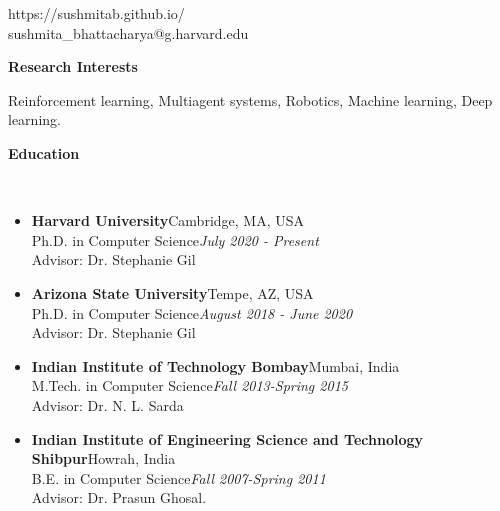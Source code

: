 \documentclass[a4paper,11pt]{article}
\newcommand{\lsep}{-0.5cm}
\newcommand{\resheading}[1]{{\small \colorbox{mygrey}{\begin{minipage}{0.975\textwidth}{\textbf{#1 \vphantom{p\^{E}}}}\end{minipage}}}}
\begin{document}
	
	\hfill https://sushmitab.github.io/\\
	\hfill sushmita\_bhattacharya@g.harvard.edu\\
	\setlength{\tabcolsep}{5pt}
	
	\vspace{10pt}
	
	\resheading{\textbf{\large Research Interests}}
	\begin{description}
		\item \hspace{0.75 cm} Reinforcement learning, Multiagent systems, Robotics, Machine learning, Deep learning.
	\end{description}
	
	\resheading{\textbf{\large Education} }\\[\lsep]
	\begin{description}
		\item 
		\begin{itemize}
			\item \textbf{Harvard  University}\hfill Cambridge, MA, USA\\
			Ph.D. in Computer Science\hfill \textit{July 2020 - Present}\\
			Advisor: Dr. Stephanie Gil
		\end{itemize}
		\item
		\begin{itemize}
			\item \textbf{Arizona State University}\hfill Tempe, AZ, USA\\
			Ph.D. in Computer Science\hfill \textit{August 2018 - June 2020}\\
			Advisor: Dr. Stephanie Gil
		\end{itemize}
		\item
		\begin{itemize}
			\item \textbf{Indian Institute of Technology Bombay}\hfill Mumbai, India\\
			M.Tech. in Computer Science\hfill \textit{Fall 2013-Spring 2015}\\
			Advisor: Dr. N. L. Sarda
		\end{itemize}
		\item
		\begin{itemize}
			\item \textbf{Indian Institute of Engineering Science and Technology Shibpur}\hfill Howrah, India\\
			B.E. in Computer Science\hfill \textit{Fall 2007-Spring 2011}\\
			Advisor: Dr. Prasun Ghosal.
		\end{itemize}
	\end{description}
	
\end{document}
